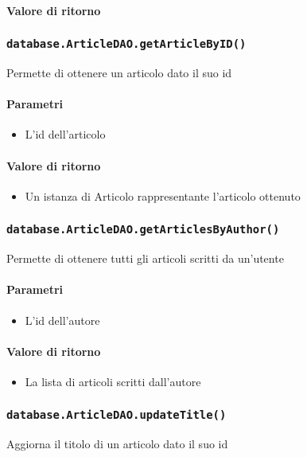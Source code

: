\paragraph{Valore di ritorno}

\subsubsection{\texttt{database.ArticleDAO.getArticleByID()}}
Permette di ottenere un articolo dato il suo id
\paragraph{Parametri}
\begin{itemize}
\item L'id dell'articolo
\end{itemize}
\paragraph{Valore di ritorno}
\begin{itemize}
\item Un istanza di Articolo rappresentante l'articolo ottenuto
\end{itemize}

\subsubsection{\texttt{database.ArticleDAO.getArticlesByAuthor()}}
Permette di ottenere tutti gli articoli scritti da un'utente
\paragraph{Parametri}
\begin{itemize}
\item L'id dell'autore
\end{itemize}
\paragraph{Valore di ritorno}
\begin{itemize}
\item La lista di articoli scritti dall'autore
\end{itemize}

\subsubsection{\texttt{database.ArticleDAO.updateTitle()}}
Aggiorna il titolo di un articolo dato il suo id
